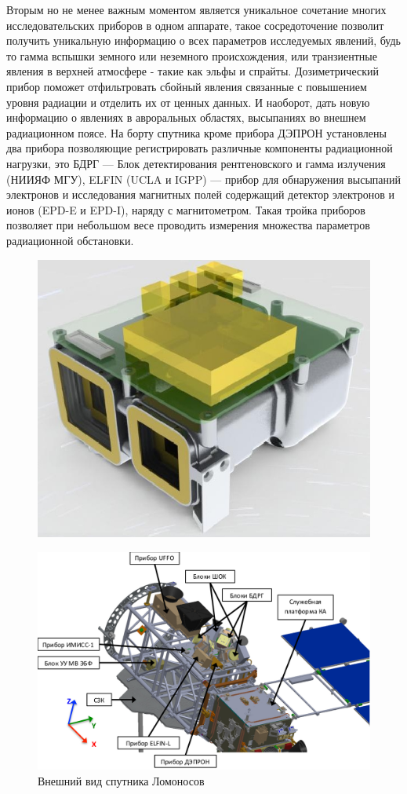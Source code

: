 Вторым но не менее важным моментом является уникальное сочетание многих исследовательских приборов в одном аппарате, такое сосредоточение позволит получить уникальную информацию о всех параметров исследуемых явлений, будь то гамма вспышки земного или неземного происхождения, или транзиентные явления в верхней атмосфере - такие как эльфы и спрайты. Дозиметрический прибор поможет отфильтровать сбойный явления связанные с повышением уровня радиации и отделить их от ценных данных. И наоборот, дать новую информацию о явлениях в авроральных областях, высыпаниях во внешнем радиационном поясе.
На борту спутника кроме прибора ДЭПРОН установлены два прибора позволяющие регистрировать различные компоненты радиационной нагрузки, это БДРГ --- Блок детектирования рентгеновского и гамма излучения (НИИЯФ МГУ), ELFIN (UCLA и IGPP) --- прибор для обнаружения высыпаний электронов и исследования магнитных полей содержащий детектор электронов и ионов (EPD-E и EPD-I), наряду с магнитометром. Такая тройка приборов позволяет при небольшом весе проводить измерения множества  параметров радиационной обстановки.



\begin{figure}

\includegraphics[width=0.7\linewidth]{images/EPD_Brochure}
\caption{}
\label{fig:epdbrochure}
\end{figure}


\begin{figure}
\centering
\includegraphics[width=0.9\linewidth]{images/lomo3}
\caption{Внешний вид спутника Ломоносов}
\label{fig:lomo3}
\end{figure}


